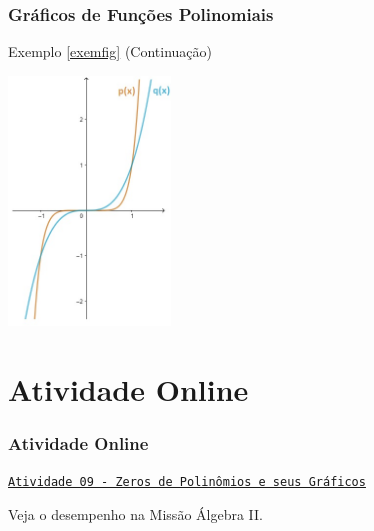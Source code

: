 \documentclass[10pt]{beamer}
\begin{document}
\begin{frame}
\frametitle{Gráficos de Funções Polinomiais} 
\begin{block}{Exemplo \ref{exemfig} (Continuação)}


\begin{center}
\includegraphics[width=4.3cm]{figures/2graf.jpg}
\end{center}


\end{block}

\end{frame}

\section{Atividade Online}
\begin{frame}
\frametitle{Atividade Online} 

\href{https://pt.khanacademy.org/math/algebra2/polynomial-functions/zeros-of-polynomials-and-their-graphs/e/using-zeros-to-graph-polynomials}
{{\tt Atividade 09 - Zeros de Polinômios e seus Gráficos}}


Veja o desempenho na Missão Álgebra II.


\end{frame}


\end{document}
